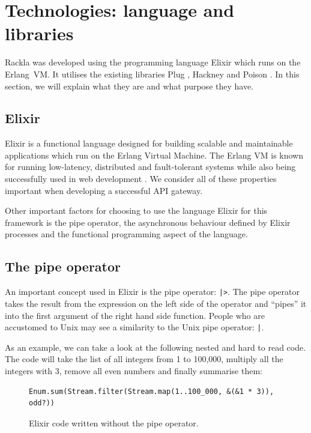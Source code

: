 \documentclass{cslthse-msc}
\begin{document}
\section{Technologies: language and libraries}
Rackla was developed using the programming language Elixir \cite{elixir} which runs on the Erlang~VM. It utilises the existing libraries Plug \cite{plug}, Hackney \cite{hackney} and Poison \cite{poison}. In this section, we will explain what they are and what purpose they have.

\subsection{Elixir}
Elixir is a functional language designed for building scalable and maintainable applications which run on the Erlang Virtual Machine. The Erlang VM is known for running low-latency, distributed and fault-tolerant systems while also being successfully used in web development \cite{elixir}. We consider all of these properties important when developing a successful API gateway.

Other important factors for choosing to use the language Elixir for this framework is the pipe operator, the asynchronous behaviour defined by Elixir processes and the functional programming aspect of the language.

\subsection{The pipe operator}
An important concept used in Elixir is the pipe operator: \lstinline{|>}. The pipe operator takes the result from the expression on the left side of the operator and \enquote{pipes} it into the first argument of the right hand side function. People who are accustomed to Unix may see a similarity to the Unix pipe operator: \lstinline{|}.

\vspace{5mm}

\noindent As an example, we can take a look at the following nested and hard to read code. The code will take the list of all integers from 1 to 100,000, multiply all the integers with 3, remove all even numbers and finally summarise them:

\begin{figure}[H]
  \centering
\begin{lstlisting}[breaklines=true,frame=single]
Enum.sum(Stream.filter(Stream.map(1..100_000, &(&1 * 3)), odd?))
\end{lstlisting}
  \caption{Elixir code written without the pipe operator.}
  \label{fig:no_pipe}
\end{figure}
\end{document}
